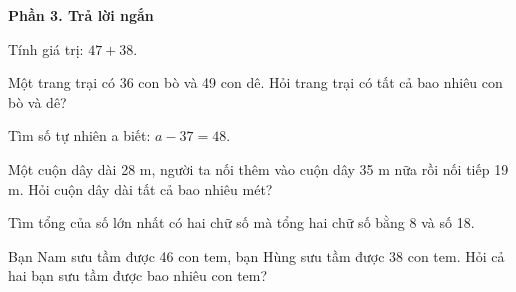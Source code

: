 \textbf{Phần 3. Trả lời ngắn}

\begin{ex} %
Tính giá trị: $47 + 38$.
\end{ex}

\begin{ex} %
Một trang trại có 36 con bò và 49 con dê. Hỏi trang trại có tất cả bao nhiêu con bò và dê?
\end{ex}

\begin{ex} %
Tìm số tự nhiên a biết: $a - 37 = 48$.
\end{ex}

\begin{ex} %
Một cuộn dây dài 28 m, người ta nối thêm vào cuộn dây 35 m nữa rồi nối tiếp 19 m. Hỏi cuộn dây dài tất cả bao nhiêu mét?
\end{ex}

\begin{ex} %
Tìm tổng của số lớn nhất có hai chữ số mà tổng hai chữ số bằng 8 và số 18.
\end{ex}

\begin{ex} %
Bạn Nam sưu tầm được 46 con tem, bạn Hùng sưu tầm được 38 con tem. Hỏi cả hai bạn sưu tầm được bao nhiêu con tem?
\end{ex}
